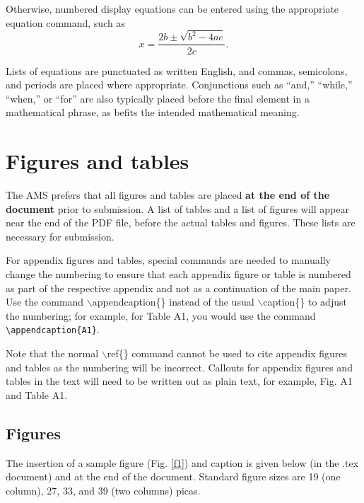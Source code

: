 \documentclass{ametsocV5}
\begin{document}
Otherwise, numbered display equations can be entered using the appropriate
equation command, such as \begin{equation}
x=\frac{2b\pm\sqrt{b^{2}-4ac}}{2c}.  \end{equation}

Lists of equations are punctuated as written English, and commas, semicolons,
and periods are placed where appropriate. Conjunctions such as ``and,''
``while,'' ``when,'' or ``for'' are also typically placed before the final
element in a mathematical phrase, as befits the intended mathematical
meaning.  

\section{Figures and tables}
The AMS prefers that all figures and tables are placed {\bf at the end of the document} prior to submission. 
A list of tables and a list of figures will appear near the end of the PDF
file, before the actual tables and figures. These lists are necessary for submission.

For appendix figures and tables, special commands are needed to manually 
change the numbering to ensure that each appendix figure or table is numbered 
as part of the respective appendix and not as a continuation of the main paper. Use the command
$\backslash$appendcaption\{\} instead of the usual $\backslash$caption\{\} to adjust the 
numbering; for example, for Table A1, you would use the command \verb+\appendcaption{A1}+.

Note that the normal $\backslash$ref\{\} command cannot be used to cite 
appendix figures and tables as the numbering will be incorrect. Callouts for appendix figures 
and tables in the text will need to be written out as plain text, for example, Fig. A1 and Table A1.

\subsection{Figures}
The insertion of a sample figure (Fig. \ref{f1})  
and caption is given below (in the .tex document) and at the end of the document. Standard figure sizes are 19 (one column), 
27, 33, and 39 (two columns) picas.

%
\end{document}
